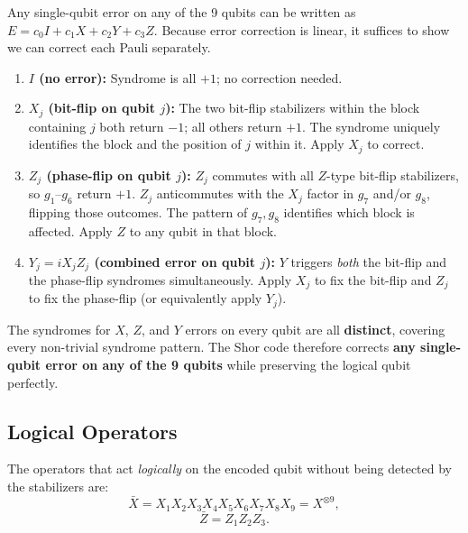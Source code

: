 \documentclass[11pt, a4paper]{article}
\theoremstyle{definition}
\theoremstyle{plain}
\theoremstyle{remark}
\begin{document}
Any single-qubit error on any of the 9 qubits can be written as
$E = c_0 I + c_1 X + c_2 Y + c_3 Z$.  Because error correction is
linear, it suffices to show we can correct each Pauli separately.

\begin{enumerate}
  \item \textbf{$I$ (no error):} Syndrome is all $+1$; no correction needed.

  \item \textbf{$X_j$ (bit-flip on qubit $j$):}
        The two bit-flip stabilizers within the block containing $j$ both
        return $-1$; all others return $+1$.  The syndrome uniquely
        identifies the block and the position of $j$ within it.
        Apply $X_j$ to correct.

  \item \textbf{$Z_j$ (phase-flip on qubit $j$):}
        $Z_j$ commutes with all $Z$-type bit-flip stabilizers, so
        $g_1$--$g_6$ return $+1$.  $Z_j$ anticommutes with the $X_j$
        factor in $g_7$ and/or $g_8$, flipping those outcomes.  The
        pattern of $g_7, g_8$ identifies which block is affected.
        Apply $Z$ to any qubit in that block.

  \item \textbf{$Y_j = iX_j Z_j$ (combined error on qubit $j$):}
        $Y$ triggers \emph{both} the bit-flip and the phase-flip syndromes
        simultaneously.  Apply $X_j$ to fix the bit-flip and $Z_j$ to fix
        the phase-flip (or equivalently apply $Y_j$).
\end{enumerate}

\begin{keypoint}
The syndromes for $X$, $Z$, and $Y$ errors on every qubit are all
\textbf{distinct}, covering every non-trivial syndrome pattern.  The Shor
code therefore corrects \textbf{any single-qubit error on any of the 9
qubits} while preserving the logical qubit perfectly.
\end{keypoint}

\subsection{Logical Operators}

The operators that act \emph{logically} on the encoded qubit without being
detected by the stabilizers are:
\[
  \bar{X} = X_1 X_2 X_3 X_4 X_5 X_6 X_7 X_8 X_9 = X^{\otimes 9},
\]
\[
  \bar{Z} = Z_1 Z_2 Z_3.
\]
\end{document}
